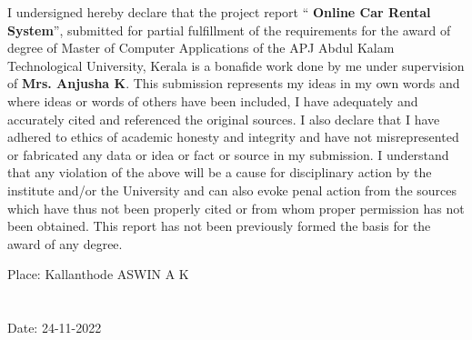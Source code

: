 \documentclass[a4paper,12pt,toc=flat]{report}
\begin{document}
	\vspace*{20pt}
	{\normalsize I undersigned hereby declare that the project report “{\bfseries 
			Online Car Rental System}”, submitted for partial fulfillment of the requirements for the award of degree of Master of Computer Applications of the APJ Abdul Kalam Technological University, Kerala is a bonafide
		work done by me under supervision of {\bf Mrs. Anjusha K}. This submission represents my ideas in my
		own words and where ideas or words of others have been included, I have adequately and accurately
		cited and referenced the original sources. I also declare that I have adhered to ethics of academic
		honesty and integrity and have not misrepresented or fabricated any data or idea or fact or source
		in my submission. I understand that any violation of the above will be a cause for disciplinary action
		by the institute and/or the University and can also evoke penal action from the sources which have
		thus not been properly cited or from whom proper permission has not been obtained. This report
		has not been previously formed the basis for the award of any degree. } \\
	
	
	\vspace{20pt}
	\begin{center}
		Place: Kallanthode \hspace*{14.5pt} \hfill  ASWIN A K  \\ \hfill\\ \hfill  \\
		\vspace*{10pt}
		Date: 24-11-2022 \hspace*{0pt} \hfill 
		\vspace{10pt}
		
		
		
	\end{center}
	
	\pagebreak
	
\end{document}
